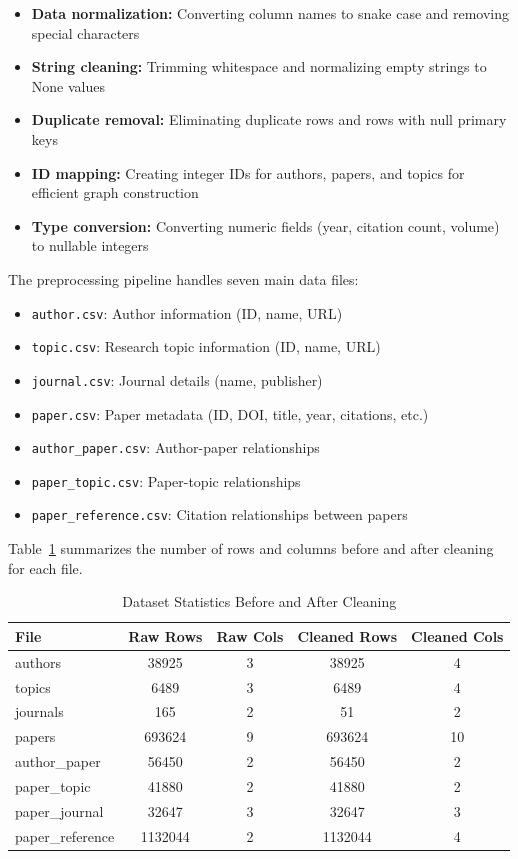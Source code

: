 \documentclass[conference]{IEEEtran}
\begin{document}
\begin{itemize}
    \item \textbf{Data normalization:} Converting column names to snake case and removing special characters
    \item \textbf{String cleaning:} Trimming whitespace and normalizing empty strings to None values
    \item \textbf{Duplicate removal:} Eliminating duplicate rows and rows with null primary keys 
    \item \textbf{ID mapping:} Creating integer IDs for authors, papers, and topics for efficient graph construction
    \item \textbf{Type conversion:} Converting numeric fields (year, citation count, volume) to nullable integers
\end{itemize}

\noindent The preprocessing pipeline handles seven main data files:
\begin{itemize}
    \item \texttt{author.csv}: Author information (ID, name, URL)
    \item \texttt{topic.csv}: Research topic information (ID, name, URL)
    \item \texttt{journal.csv}: Journal details (name, publisher)
    \item \texttt{paper.csv}: Paper metadata (ID, DOI, title, year, citations, etc.)
    \item \texttt{author\_paper.csv}: Author-paper relationships
    \item \texttt{paper\_topic.csv}: Paper-topic relationships
    \item \texttt{paper\_reference.csv}: Citation relationships between papers
\end{itemize}


Table~\ref{tab:datacleaning} summarizes the number of rows and columns before and after cleaning for each file. 

\begin{table}[ht]
\centering
\caption{Dataset Statistics Before and After Cleaning}
\label{tab:datacleaning}
\begin{tabular}{|l|c|c|c|c|}
\hline
\textbf{File} & \textbf{Raw Rows} & \textbf{Raw Cols} & \textbf{Cleaned Rows} & \textbf{Cleaned Cols} \\
\hline
authors        & 38925  & 3 & 38925   & 4 \\
topics         & 6489   & 3 & 6489    & 4 \\
journals       & 165    & 2 & 51      & 2 \\
papers         & 693624 & 9 & 693624  & 10 \\
author\_paper   & 56450  & 2 & 56450   & 2 \\
paper\_topic    & 41880  & 2 & 41880   & 2 \\
paper\_journal  & 32647  & 3 & 32647   & 3 \\
paper\_reference& 1132044& 2 & 1132044 & 4 \\
\hline
\end{tabular}
\end{table}
\end{document}
